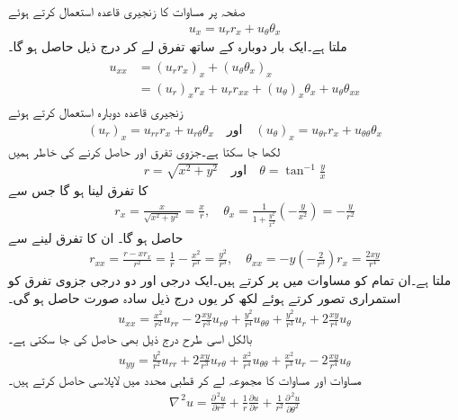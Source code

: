 صفحہ   پر مساوات  کا زنجیری قاعدہ استعمال کرتے ہوئے
\begin{align*}
u_x=u_r r_x+u_{\theta}\theta_x
\end{align*}
ملتا ہے۔ایک بار دوبارہ  کے ساتھ تفرق لے کر درج ذیل حاصل ہو گا۔
\begin{gather}
\begin{aligned}\label{مساوات_جزوی_لاپلاسی__رکن_الف}
u_{xx}&=(u_r r_x)_x+(u_{\theta}\theta_x)_x\\
&=(u_r)_xr_x+u_rr_{xx}+(u_{\theta})_x\theta_x+u_{\theta}\theta_{xx}
\end{aligned}
\end{gather}
زنجیری قاعدہ دوبارہ استعمال کرتے ہوئے
\begin{align*}
(u_r)_x=u_{rr}r_x+u_{r\theta}\theta_x\quad \text{اور}\quad (u_{\theta})_x=u_{\theta r}r_x+u_{\theta \theta} \theta_x
\end{align*}
لکھا جا سکتا ہے۔جزوی تفرق  اور  حاصل کرنے کی خاطر ہمیں
\begin{align*}
r=\sqrt{x^2+y^2}\quad \text{اور}\quad \theta=\tan^{-1}\frac{y}{x}
\end{align*}
کا تفرق لینا ہو گا جس سے 
\begin{align*}
r_x=\frac{x}{\sqrt{x^2+y^2}}=\frac{x}{r}, \quad \theta_x=\frac{1}{1+\frac{y^2}{x^2}}\left(-\frac{y}{x^2}\right)=-\frac{y}{r^2}
\end{align*}
حاصل ہو گا۔ ان کا  تفرق لینے سے
\begin{align*}
r_{xx}=\frac{r-xr_x}{r^2}=\frac{1}{r}-\frac{x^2}{r^3}=\frac{y^2}{r^3},\quad \theta_{xx}=-y\left(-\frac{2}{r^3}\right)r_x=\frac{2xy}{r^4}
\end{align*}
ملتا ہے۔ان تمام کو مساوات  میں پر کرتے ہیں۔ایک درجی اور دو درجی جزوی تفرق کو استمراری تصور کرتے ہوئے  لکھ کر یوں درج ذیل سادہ صورت حاصل ہو گی۔
 \begin{align}\label{مساوات_جزوی_لاپلاسی__رکن_ب}
u_{xx}=\frac{x^2}{r^2}u_{rr}-2\frac{xy}{r^3}u_{r\theta}+\frac{y^2}{r^4}u_{\theta\theta}+\frac{y^2}{r^3}u_r+2\frac{xy}{r^4}u_{\theta}
\end{align}
بالکل اسی طرح درج ذیل بھی حاصل کی جا سکتی ہے۔
\begin{align}\label{مساوات_جزوی_لاپلاسی__رکن_پ}
u_{yy}=\frac{y^2}{r^2}u_{rr}+2\frac{xy}{r^3}u_{r\theta}+\frac{x^2}{r^4}u_{\theta\theta}+\frac{x^2}{r^3}u_r-2\frac{xy}{r^4}u_{\theta}
\end{align}
مساوات  اور مساوات  کا مجموعہ لے کر قطبی محدد میں لاپلاسی حاصل کرتے ہیں۔
\begin{align}\label{مساوات_جزوی_لاپلاسی__رکن_ت}
\nabla^{\,2}u=\frac{\partial^{\,2}u}{\partial r^2}+\frac{1}{r}\frac{\partial u}{\partial r}+\frac{1}{r^2}\frac{\partial^{\,2}u}{\partial \theta^2}
\end{align}

